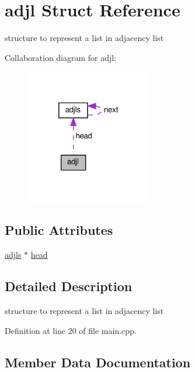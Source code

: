 \hypertarget{structadjl}{}\section{adjl Struct Reference}
\label{structadjl}


structure to represent a list in adjacency list  




Collaboration diagram for adjl\+:
\nopagebreak
\begin{figure}[H]
\begin{center}
\leavevmode
\includegraphics[width=157pt]{structadjl__coll__graph}
\end{center}
\end{figure}
\subsection*{Public Attributes}
\begin{DoxyCompactItemize}
\item 
\hyperlink{structadjls}{adjls} $\ast$ \hyperlink{structadjl_abb2ac2f6001871d6dbe505a55ce0277b}{head}
\end{DoxyCompactItemize}


\subsection{Detailed Description}
structure to represent a list in adjacency list 

Definition at line 20 of file main.\+cpp.



\subsection{Member Data Documentation}
\mbox{\label{structadjl_abb2ac2f6001871d6dbe505a55ce0277b}} 
